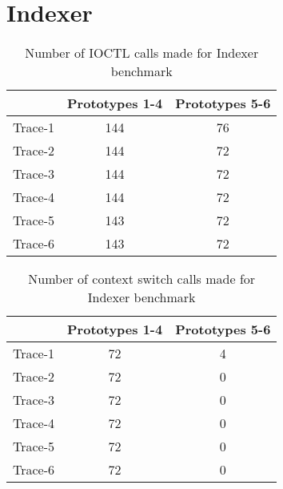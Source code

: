 \section{Indexer}

\begin{table}[h]
\begin{center}
 \begin{tabular}{|c c c|} 
 \hline
 & Prototypes 1-4 & Prototypes 5-6\\ %
 \hline
Trace-1 & 144 & 76\\
Trace-2 & 144 & 72\\
Trace-3 & 144 & 72\\
Trace-4 & 144 & 72\\
Trace-5 & 143 & 72\\
Trace-6 & 143 & 72\\
\hline
\end{tabular}
\end{center}
\caption{Number of IOCTL calls made for Indexer benchmark}
\label{indexer_num_syncs}

\end{table}

\begin{table}[h]
\begin{center}
 \begin{tabular}{|c c c|} 
 \hline
 & Prototypes 1-4 & Prototypes 5-6\\ %
 \hline
Trace-1 & 72 & 4\\
Trace-2 & 72 & 0\\
Trace-3 & 72 & 0\\
Trace-4 & 72 & 0\\
Trace-5 & 72 & 0\\
Trace-6 & 72 & 0\\
\hline
\end{tabular}
\end{center}
\caption{Number of context switch calls made for Indexer benchmark}
\label{indexer_num_ctxt}
\end{table}
\newpage
